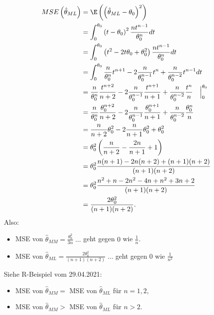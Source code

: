 \documentclass{tstextbook}
\begin{document}
\begin{example}
	\[
	\begin{aligned}
		MSE\left(\hat{\theta}_{ML}\right) & = \E\left(\left(\hat{\theta}_{ML} - \theta_0\right)^2\right) \\
		& = \int_{0}^{\theta_0} \left(t-\theta_0\right)^2 \frac{nt^{n-1}}{\theta_0^n} dt \\
		& = \int_{0}^{\theta_0} \left(t^2-2t\theta_0+\theta_0^2\right) \frac{nt^{n-1}}{\theta_0^n} dt \\
		& = \int_{0}^{\theta_0} \frac{n}{\theta_0^n} t^{n+1} - 2\frac{n}{\theta_0^{n-1}} t^n + \frac{n}{\theta_0^{n-2}} t^{n-1} dt \\
		& = \frac{n}{\theta_0^n} \frac{t^{n+2}}{n+2} - 2\frac{n}{\theta_0^{n-1}} \frac{t^{n+1}}{n+1} + \frac{n}{\theta_0^{n-2}} \frac{t^n}{n} \quad \Big|_0^{\theta_0} \\
		& = \frac{n}{\theta_0^n}\frac{\theta_0^{n+2}}{n+2} - 2\frac{n}{\theta_0^{n-1}} \frac{\theta_0^{n+1}}{n+1} + \frac{n}{\theta_0^{n-2}} \frac{\theta_0^n}{n} \\
		& = \frac{n}{n+2} \theta_0^2 - 2\frac{n}{n+1} \theta_0^2 + \theta_0^2 \\
		& = \theta_0^2 \left(\frac{n}{n+2}-\frac{2n}{n+1}+1\right) \\
		& = \theta_0^2 \frac{n(n+1)-2n(n+2)+(n+1)(n+2)}{(n+1)(n+2)} \\
		& = \theta_0^2 \frac{n^2+n-2n^2-4n+n^2+3n+2}{(n+1)(n+2)} \\
		& = \frac{2\theta_0^2}{(n+1)(n+2)}.
	\end{aligned}
	\]
Also: \begin{itemize}
	\item MSE von $ \hat{\theta}_{MM} = \frac{\theta_0^2}{3n}\; \ldots $ geht gegen $ 0 $ wie $ \frac{1}{n} $. 
	\item MSE von $ \hat{\theta}_{ML} = \frac{2\theta_0^2}{(n+1)(n+2)} \; \ldots $ geht gegen $ 0 $ wie $ \frac{1}{n^2} $
	\end{itemize}
	
	Siehe R-Beispiel vom 29.04.2021:
	\begin{itemize}
		\item MSE von $ \hat{\theta}_{MM} = $ MSE von $ \hat{\theta}_{ML} $ für $ n = 1, 2 $, 
		\item MSE von $ \hat{\theta}_{MM} > $ MSE von $ \hat{\theta}_{ML} $ für $ n > 2 $.
	\end{itemize}
	
\end{example}
\end{document}
